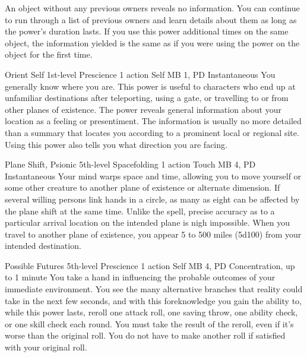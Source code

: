   An object without any previous owners reveals no information.
  You can continue to run through a list of previous owners
  and learn details about them as long as the power's duration lasts.
  If you use this power additional times on the same object,
  the information yielded is the same
  as if you were using the power on the object for the first time.

\DndPowerHeader%
  {Orient Self}
  {1st-level Prescience}
  {1 action}
  {Self}
  {MB 1, PD \lvlone}
  {Instantaneous}
You generally know where you are.
This power is useful to characters who end up at unfamiliar destinations
after teleporting,
using a gate,
or travelling to or from other planes of existence.
The power reveals general information about your location
as a feeling or presentiment.
The information is usually no more detailed than a summary
that locates you according to a prominent local or regional site.
Using this power also tells you what direction you are facing.

\DndPowerHeader%
  {Plane Shift, Psionic}
  {5th-level Spacefolding}
  {1 action}
  {Touch}
  {MB 4, PD \lvlfive}
  {Instantaneous}
  Your mind warps space and time,
  allowing you to move yourself
  or some other creature to another plane of existence
  or alternate dimension.
  If several willing persons link hands in a circle,
  as many as eight can be affected by the plane shift at the same time.
  Unlike the  spell,
  precise accuracy as to a particular arrival location
  on the intended plane is nigh impossible.
  When you travel to another plane of existence,
  you appear 5 to 500 miles (5d100) from your intended destination.

\DndPowerHeader%
  {Possible Futures}
  {5th-level Prescience}
  {1 action}
  {Self}
  {MB 4, PD \lvlfive}
  {Concentration, up to 1 minute}
  You take a hand in influencing the probable outcomes
  of your immediate environment.
  You see the many alternative branches that reality could take
  in the next few seconds,
  and with this foreknowledge you gain the ability to,
  while this power lasts,
  reroll one attack roll,
  one saving throw,
  one ability check,
  or one skill check each round.
  You must take the result of the reroll,
  even if it's worse than the original roll.
  You do not have to make another roll
  if satisfied with your original roll.

